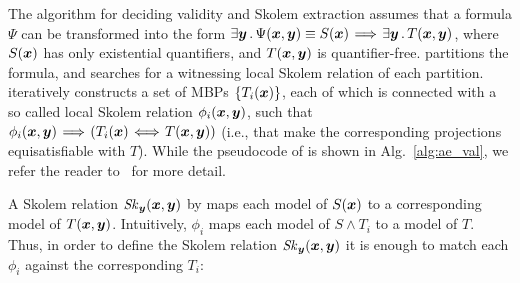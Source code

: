 The algorithm \aeval for deciding validity and Skolem extraction assumes that a formula $\Psi$ can be transformed
into the form ${\exists \vy \such \Psi(\vx, \vy)} \equiv {S(\vx)
  \!\implies\! \exists \vy \such T(\vx,\vy)}$, where $S(\vx)$ has only
existential quantifiers, and $T(\vx, \vy)$ is quantifier-free.
%
\aeval partitions
the formula, and searches for a witnessing local Skolem relation of
each partition.  \aeval iteratively constructs a set of MBPs $\{T_i(\vx)\}$, each of which 
is connected with a so called local Skolem relation $\phi_i(\vx,\vy)$, such that
$\phi_i(\vx,\vy) \!\implies\! (T_{i}(\vx) \!\iff\!
  T(\vx,\vy))$ (i.e., that make the corresponding projections equisatisfiable with $T$).
While the pseudocode of \aeval is shown in Alg.~\ref{alg:ae_val}, we refer the reader to~\cite{fedyukovich2015automated} for
more detail.


\newcommand{\skolemcases}{%
\begin{equation}
\label{case:skolem}
\mathit{Sk}_{\vy} (\vx, \vy) \equiv
\begin{cases}
  \phi_{1} (\vx, \vy)  & \text{if } T_1 (\vx) \\
    \phi_{2} (\vx, \vy)  & \text{else if } T_2 (\vx)\\
  \cdots &\text{\qquad else }\cdots \\
  \phi_{n} (\vx, \vy) & \text{\qquad\qquad else } T_n (\vx) \\
\end{cases}
\end{equation}
}

A Skolem relation
${\mathit{Sk}_{\vy} (\vx, \vy)}$ by \aeval maps each
model of $S(\vx)$ to a corresponding model of $T(\vx,\vy)$.
Intuitively, $\phi_i$ maps each model of $S \land T_{i}$ to a model of $T$.
Thus, in order to define the  Skolem relation $\mathit{Sk}_{\vy}(\vx, \vy)$ it is enough to 
match each $\phi_i$ against the corresponding $T_{i}$:

